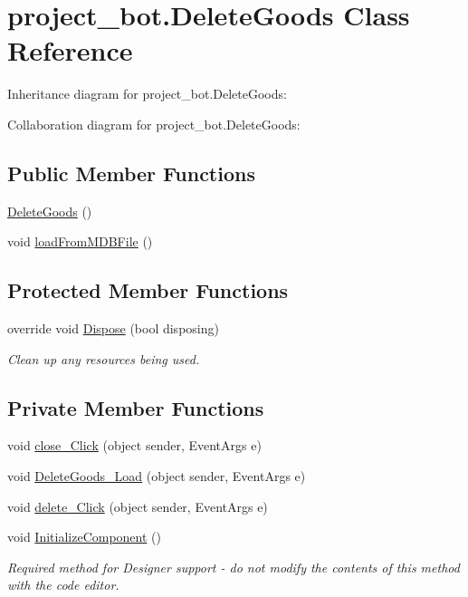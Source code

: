 \hypertarget{classproject__bot_1_1_delete_goods}{}\section{project\+\_\+bot.\+Delete\+Goods Class Reference}
\label{classproject__bot_1_1_delete_goods}


Inheritance diagram for project\+\_\+bot.\+Delete\+Goods\+:


Collaboration diagram for project\+\_\+bot.\+Delete\+Goods\+:
\subsection*{Public Member Functions}
\begin{DoxyCompactItemize}
\item 
\hyperlink{classproject__bot_1_1_delete_goods_aa54c37fcade489d8a3814b99d644bdc3}{Delete\+Goods} ()
\item 
void \hyperlink{classproject__bot_1_1_delete_goods_abab9edf8ed6cdf9465263e469fad0e0b}{load\+From\+M\+D\+B\+File} ()
\end{DoxyCompactItemize}
\subsection*{Protected Member Functions}
\begin{DoxyCompactItemize}
\item 
override void \hyperlink{classproject__bot_1_1_delete_goods_af62f826c5fbbaa910fef488ccdd54531}{Dispose} (bool disposing)
\begin{DoxyCompactList}\small\item\em Clean up any resources being used. \end{DoxyCompactList}\end{DoxyCompactItemize}
\subsection*{Private Member Functions}
\begin{DoxyCompactItemize}
\item 
void \hyperlink{classproject__bot_1_1_delete_goods_a845f1fe8c54f6b239984ce0916754cb8}{close\+\_\+\+Click} (object sender, Event\+Args e)
\item 
void \hyperlink{classproject__bot_1_1_delete_goods_af370b0ab48634b8319c7e059775194fa}{Delete\+Goods\+\_\+\+Load} (object sender, Event\+Args e)
\item 
void \hyperlink{classproject__bot_1_1_delete_goods_a4aac5de189012c1bb7c1161b019b97a8}{delete\+\_\+\+Click} (object sender, Event\+Args e)
\item 
void \hyperlink{classproject__bot_1_1_delete_goods_a7bd2e7ba312bb180d8c75b6eb9c339b7}{Initialize\+Component} ()
\begin{DoxyCompactList}\small\item\em Required method for Designer support -\/ do not modify the contents of this method with the code editor. \end{DoxyCompactList}\end{DoxyCompactItemize}
